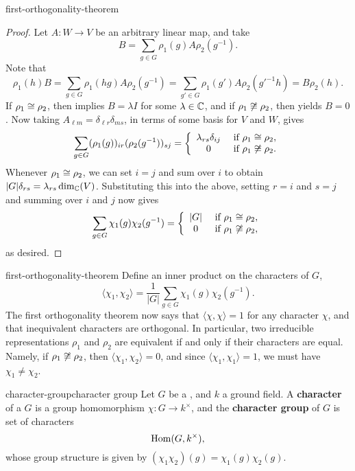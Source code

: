 \begin{example}{first-orthogonality-theorem}
    \begin{proof}
        Let $A : W \to V$ be an arbitrary linear map, and take
        \[ B = \sum_{g \in G} \rho_1(g) A \rho_2(g^{-1}) . \]
        Note that
        \[ \rho_1(h) B = \sum_{g \in G} \rho_1(hg) A \rho_2(g^{-1}) = \sum_{g' \in G} \rho_1(g') A \rho_2(g'^{-1} h) = B \rho_2(h) . \]
        If $\rho_1 \cong \rho_2$, then  implies $B = \lambda I$ for some $\lambda \in \mathbb{C}$, and if $\rho_1 \not\cong \rho_2$, then  yields $B = 0$. Now taking $A_{\ell m} = \delta_{\ell r} \delta_{ms}$, in terms of some basis for $V$ and $W$, gives
        \[ \sum_{g \in G} (\rho_1(g))_{ir} (\rho_2(g^{-1}))_{sj} = \left\{ \begin{array}{cl} \lambda_{rs} \delta_{ij} & \textup{ if } \rho_1 \cong \rho_2 , \\ 0 & \textup{ if } \rho_1 \not\cong \rho_2 . \end{array} \right. \]
        Whenever $\rho_1 \cong \rho_2$, we can set $i = j$ and sum over $i$ to obtain $|G| \delta_{rs} = \lambda_{rs} \dim_{\mathbb{C}}(V)$. Substituting this into the above, setting $r = i$ and $s = j$ and summing over $i$ and $j$ now gives
        \[ \sum_{g \in G} \chi_1(g) \chi_2(g^{-1}) = \left\{ \begin{array}{cl} |G| & \textup{ if } \rho_1 \cong \rho_2 , \\ 0 & \textup{ if } \rho_1 \not\cong \rho_2 , \end{array} \right. \]
        as desired.
    \end{proof}
\end{example}

\begin{example}{first-orthogonality-theorem}
    Define an inner product on the characters of $G$,
    \[ \langle \chi_1, \chi_2 \rangle = \frac{1}{|G|} \sum_{g \in G} \chi_1(g) \chi_2(g^{-1}) . \]
    The first orthogonality theorem now says that $\langle \chi, \chi \rangle = 1$ for any character $\chi$, and that inequivalent characters are orthogonal. In particular, two irreducible representations $\rho_1$ and $\rho_2$ are equivalent if and only if their characters are equal. Namely, if $\rho_1 \not\cong \rho_2$, then $\langle \chi_1, \chi_2 \rangle = 0$, and since $\langle \chi_1, \chi_1 \rangle = 1$, we must have $\chi_1 \ne \chi_2$.
\end{example}

\begin{topic}{character-group}{character group}
    Let $G$ be a , and $k$ a ground field. A \textbf{character} of a $G$ is a group homomorphism $\chi : G \to k^\times$, and the \textbf{character group} of $G$ is set of characters
    \[ \operatorname{Hom}(G, k^\times) , \]
    whose group structure is given by $(\chi_1 \chi_2)(g) = \chi_1(g) \chi_2(g)$.
\end{topic}

